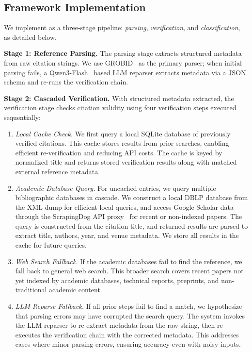 \subsection{Framework Implementation}
\label{subsec:framework_impl}

We implement \citeb as a three-stage pipeline: \textit{parsing}, \textit{verification}, and \textit{classification}, as detailed below.

\noindent
\textbf{Stage 1: Reference Parsing.}
The parsing stage extracts structured metadata from raw citation strings.
We use GROBID~\cite{grobid-client-python} as the primary parser; when initial parsing fails, a Qwen3-Flash~\cite{bai2023qwen} based LLM reparser extracts metadata via a JSON schema and re-runs the verification chain.

\noindent\textbf{Stage 2: Cascaded Verification.}
With structured metadata extracted, the verification stage checks citation validity using four verification steps executed sequentially:

\begin{enumerate}
    \item \textit{Local Cache Check.}
    We first query a local SQLite database of previously verified citations.
    This cache stores results from prior searches, enabling efficient re-verification and reducing API costs.
    The cache is keyed by normalized title and returns stored verification results along with matched external reference metadata.
    
    \item \textit{Academic Database Query.}
    For uncached entries, we query multiple bibliographic databases in cascade.
    We construct a local DBLP database from the XML dump for efficient local queries, and access Google Scholar data through the ScrapingDog API proxy~\cite{scrapingdog} for recent or non-indexed papers.
    The query is constructed from the citation title, and returned results are parsed to extract title, authors, year, and venue metadata. We store all results in the cache for future queries.

    \item \textit{Web Search Fallback.}
    If the academic databases fail to find the reference, we fall back to general web search.
    This broader search covers recent papers not yet indexed by academic databases, technical reports, preprints, and non-traditional academic content.

    \item \textit{LLM Reparse Fallback.}
    If all prior steps fail to find a match, we hypothesize that parsing errors may have corrupted the search query.
    The system invokes the LLM reparser to re-extract metadata from the raw string, then re-executes the verification chain with the corrected metadata.
    This addresses cases where minor parsing errors, ensuring accuracy even with noisy inputs.
\end{enumerate}

